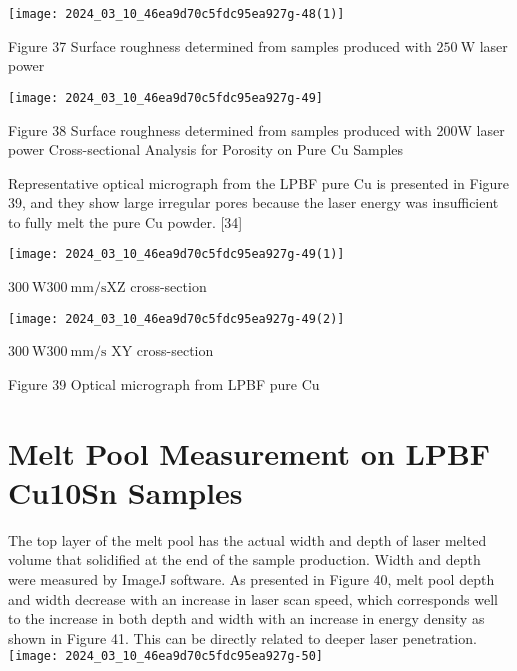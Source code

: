 \documentclass[10pt]{article}
\begin{document}
\begin{center}
\texttt{[image: 2024\_03\_10\_46ea9d70c5fdc95ea927g-48(1)]}
\end{center}

Figure 37 Surface roughness determined from samples produced with $250 \mathrm{~W}$ laser power

\begin{center}
\texttt{[image: 2024\_03\_10\_46ea9d70c5fdc95ea927g-49]}
\end{center}

Figure 38 Surface roughness determined from samples produced with 200W laser power Cross-sectional Analysis for Porosity on Pure Cu Samples

Representative optical micrograph from the LPBF pure $\mathrm{Cu}$ is presented in Figure 39, and they show large irregular pores because the laser energy was insufficient to fully melt the pure $\mathrm{Cu}$ powder. [34]

\begin{center}
\texttt{[image: 2024\_03\_10\_46ea9d70c5fdc95ea927g-49(1)]}
\end{center}

$300 \mathrm{~W} 300 \mathrm{~mm} / \mathrm{s} \mathrm{XZ}$ cross-section

\begin{center}
\texttt{[image: 2024\_03\_10\_46ea9d70c5fdc95ea927g-49(2)]}
\end{center}

$300 \mathrm{~W} 300 \mathrm{~mm} / \mathrm{s}$ XY cross-section

Figure 39 Optical micrograph from LPBF pure Cu

\section*{Melt Pool Measurement on LPBF Cu10Sn Samples}
The top layer of the melt pool has the actual width and depth of laser melted volume that solidified at the end of the sample production. Width and depth were measured by ImageJ software. As presented in Figure 40, melt pool depth and width decrease with an increase in laser scan speed, which corresponds well to the increase in both depth and width with an increase in energy density as shown in Figure 41. This can be directly related to deeper laser penetration.\\
\texttt{[image: 2024\_03\_10\_46ea9d70c5fdc95ea927g-50]}
\end{document}
